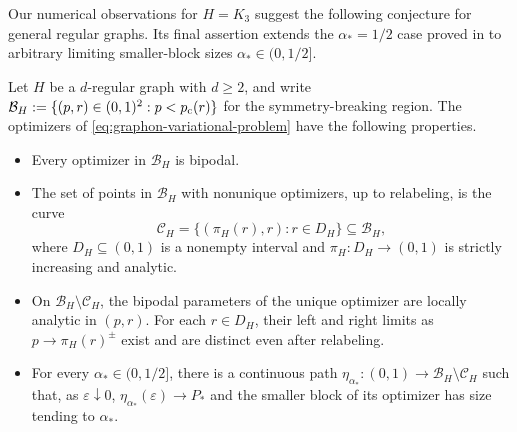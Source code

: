 Our numerical observations for $H=K_3$ suggest the following conjecture for
general regular graphs.  Its final assertion extends the $\alpha_*=1/2$ case proved
in  to arbitrary limiting smaller-block
sizes $\alpha_*\in(0,1/2]$.
\begin{conj}
\label{conj:symmetry-breaking-optimizers}
Let $H$ be a $d$-regular graph with $d\ge2$, and write
$\mathcal B_H:=\{(p,r)\in(0,1)^2:p<p_{\mathrm c}(r)\}$ for the symmetry-breaking region.
The optimizers of \eqref{eq:graphon-variational-problem} have the following properties.
\begin{itemize}
  \item Every optimizer in $\mathcal B_H$ is bipodal.

  \item The set of points in $\mathcal B_H$ with nonunique optimizers,
  up to relabeling, is the curve
  \[
    \mathcal C_H=\{(\pi_H(r),r):r\in D_H\}\subseteq\mathcal B_H,
  \]
  where $D_H\subseteq(0,1)$ is a nonempty interval and
  $\pi_H:D_H\to(0,1)$ is strictly increasing and analytic.

  \item On $\mathcal B_H\setminus\mathcal C_H$, the bipodal parameters
  of the unique optimizer are locally analytic in $(p,r)$.
  For each $r\in D_H$, their left and right limits as $p\to\pi_H(r)^{\pm}$ exist and are
  distinct even after relabeling.

  \item For every $\alpha_*\in(0,1/2]$, there is a continuous path
  $\eta_{\alpha_*}:(0,1)\to\mathcal B_H\setminus\mathcal C_H$ such that, as
  $\varepsilon\downarrow0$, $\eta_{\alpha_*}(\varepsilon)\to P_*$ and the smaller
  block of its optimizer has size tending to $\alpha_*$.
\end{itemize}
\end{conj}
